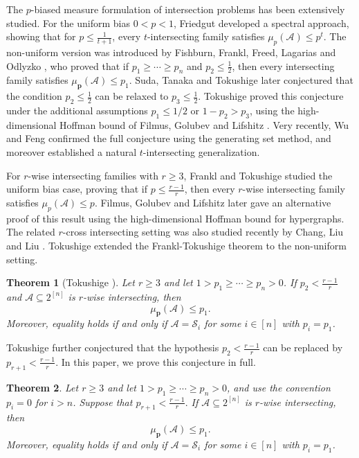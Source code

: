 \documentclass[11pt]{article}
\newtheorem{theorem}{Theorem}[section]
\begin{document}
The $p$-biased measure formulation of intersection problems has been extensively studied. For the uniform bias $0<p<1$, Friedgut \cite{F08} developed a spectral approach, showing that for $p\le \frac{1}{t+1}$, every $t$-intersecting family satisfies $\mu_p(\mathcal{A})\le p^t$. The non-uniform version was introduced by Fishburn, Frankl, Freed, Lagarias and Odlyzko \cite{F86}, who proved that if $p_1\ge\cdots\ge p_n$ and $p_2\le \frac{1}{2}$, then every intersecting family satisfies $\mu_{\mathbf{p}}(\mathcal{A})\le p_1$. Suda, Tanaka and Tokushige \cite{S17} later conjectured that the condition $p_2\le \frac{1}{2}$ can be relaxed to $p_3\le \frac{1}{2}$. Tokushige \cite{T22} proved this conjecture under the additional assumptions $p_1\le 1/2$ or $1-p_2>p_3$, using the high-dimensional Hoffman bound of Filmus, Golubev and Lifshitz \cite{F21}. Very recently, Wu and Feng \cite{W26} confirmed the full conjecture using the generating set method, and moreover established a natural $t$-intersecting generalization.


For $r$-wise intersecting families with $r\ge 3$, Frankl and Tokushige \cite{F03} studied the uniform bias case, proving that if $p\leq\frac{r-1}{r}$, then every $r$-wise intersecting family satisfies $\mu_p(\mathcal A)\le p$. Filmus, Golubev and Lifshitz \cite{F21} later gave an alternative proof of this result using the high-dimensional Hoffman bound for hypergraphs. The related $r$-cross intersecting setting was also studied recently by Chang, Liu and Liu \cite{C26}. Tokushige \cite{T22} extended the Frankl-Tokushige theorem to the non-uniform setting.

\begin{theorem}[Tokushige \cite{T22}]\label{T22}
Let $r\ge 3$ and let $1>p_1\ge\cdots\ge p_n>0$. If $p_2<\frac{r-1}{r}$ and $\mathcal A\subseteq 2^{[n]}$ is $r$-wise intersecting, then
$$
\mu_{\mathbf p}(\mathcal A)\le p_1.
$$
Moreover, equality holds if and only if $\mathcal A=\mathcal S_i$ for some $i\in[n]$ with $p_i=p_1$.
\end{theorem}

Tokushige further conjectured that the hypothesis $p_2<\frac{r-1}{r}$ can be replaced by $p_{r+1}<\frac{r-1}{r}$. In this paper, we prove this conjecture in full.

\begin{theorem}\label{M1}
Let $r\ge3$ and let $1>p_1\ge\cdots\ge p_n>0$, and use the convention $p_i=0$ for $i>n$. Suppose that
$
p_{r+1}<\frac{r-1}{r}.
$
If $\mathcal{A}\subseteq2^{[n]}$ is $r$-wise intersecting, then
$$
\mu_{\mathbf{p}}(\mathcal{A})\le p_1.
$$
Moreover, equality holds if and only if $\mathcal{A}=\mathcal{S}_i$ for some $i\in[n]$ with $p_i=p_1$.
\end{theorem}
\end{document}
